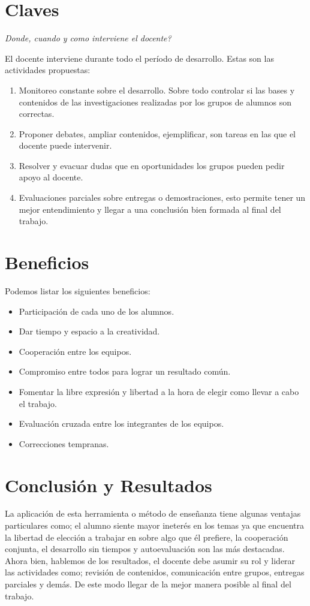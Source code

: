 \section{Claves}
\begin{center}
 \textit{ Donde, cuando y como interviene el docente?}
\end{center} 
El docente interviene durante todo el per\'iodo de desarrollo. Estas son las actividades propuestas:\\
\begin{enumerate}
 \item Monitoreo constante sobre el desarrollo. Sobre todo controlar si las bases y contenidos de las investigaciones realizadas por los grupos de alumnos son
 correctas.
 \item Proponer debates, ampliar contenidos, ejemplificar, son tareas en las que el docente puede intervenir.
 \item Resolver y evacuar dudas que en oportunidades los grupos pueden pedir apoyo al docente.
 \item Evaluaciones parciales sobre entregas o demostraciones, esto permite tener un mejor entendimiento y llegar a una conclusi\'on bien formada al final del
 trabajo.
\end{enumerate}

\section{Beneficios}
Podemos listar los siguientes beneficios:\\
\begin{itemize}
 \item Participaci\'on de cada uno de los alumnos.
 \item Dar tiempo y espacio a la creatividad.
 \item Cooperaci\'on entre los equipos.
 \item Compromiso entre todos para lograr un resultado com\'un.
 \item Fomentar la libre expresi\'on y libertad a la hora de elegir como llevar a cabo el trabajo.
 \item Evaluaci\'on cruzada entre los integrantes de los equipos.
 \item Correcciones tempranas.
\end{itemize}

\section{Conclusi\'on y Resultados}
La aplicaci\'on de esta herramienta o m\'etodo de ense\~nanza tiene algunas ventajas particulares como; el alumno siente mayor ineter\'es en los temas ya que
encuentra la libertad de elecci\'on a trabajar en sobre algo que \'el prefiere, la cooperaci\'on conjunta, el desarrollo sin tiempos y autoevaluaci\'on son las 
m\'as destacadas.\\
Ahora bien, hablemos de los resultados, el docente debe asumir su rol y liderar las actividades como; revisi\'on de contenidos, comunicaci\'on entre grupos, 
entregas parciales y dem\'as. De este modo llegar de la mejor manera posible al final del trabajo.



